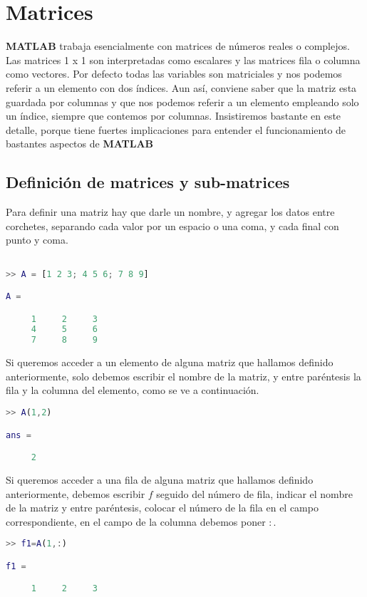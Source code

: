 \chapter{Matrices}

\textbf{MATLAB} trabaja esencialmente con matrices de números reales o complejos. Las matrices 1 x 1 son interpretadas como escalares y las matrices fila o columna como vectores. Por defecto todas las variables son matriciales y nos podemos referir a un elemento con dos índices. Aun así, conviene saber que la matriz esta guardada por columnas y que nos podemos referir a un elemento empleando solo un índice, siempre que contemos por columnas. Insistiremos bastante en este detalle, porque tiene fuertes implicaciones para entender el funcionamiento de bastantes aspectos de \textbf{MATLAB}

\section{Definición de matrices y sub-matrices}
Para definir una matriz hay que darle un nombre, y agregar los datos entre corchetes, separando cada valor por un espacio o una coma, y cada final con punto y coma.
\begin{lstlisting}[language=Matlab]

>> A = [1 2 3; 4 5 6; 7 8 9]

A =

     1     2     3
     4     5     6
     7     8     9

\end{lstlisting}

Si queremos acceder a un elemento de alguna matriz que hallamos definido anteriormente, solo debemos escribir el nombre de la matriz, y entre paréntesis la fila y la columna del elemento, como se ve a continuación.
\begin{lstlisting}[language=Matlab]
>> A(1,2)

ans =

     2

\end{lstlisting}

Si queremos acceder a una fila de alguna matriz que hallamos definido anteriormente, debemos escribir $f$ seguido del número de fila, indicar el nombre de la matriz y entre paréntesis, colocar el número de la fila en el campo correspondiente, en el campo de la columna debemos poner $:$.
\begin{lstlisting}[language=Matlab]
>> f1=A(1,:)

f1 =

     1     2     3

\end{lstlisting}

